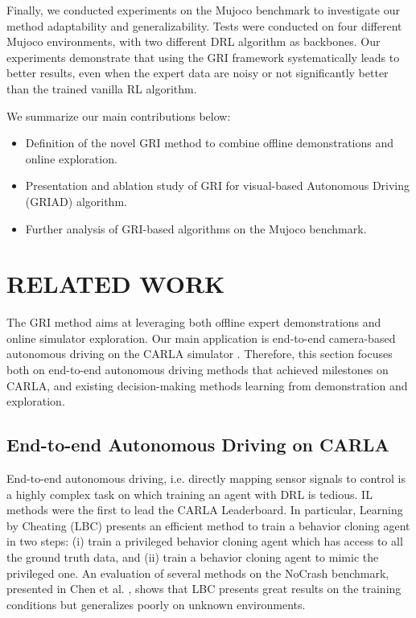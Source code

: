 \documentclass[letterpaper, 10 pt, conference]{ieeeconf}
\begin{document}
Finally, we conducted experiments on the Mujoco \cite{mujoco} benchmark to investigate our method adaptability and generalizability. Tests were conducted on four different Mujoco environments, with two different DRL algorithm as backbones. Our experiments demonstrate that using the GRI framework systematically leads to better results, even when the expert data are noisy or not significantly better than the trained vanilla RL algorithm.

We summarize our main contributions below:
\begin{itemize}
\itemsep0em 

    \item Definition of the novel GRI method to combine offline demonstrations and online exploration.
    \item Presentation and ablation study of GRI for visual-based Autonomous Driving (GRIAD) algorithm.
    \item Further analysis of GRI-based algorithms on the Mujoco benchmark. 
\end{itemize}


\section{RELATED WORK}
The GRI method aims at leveraging both offline expert demonstrations and online simulator exploration. Our main application is end-to-end camera-based autonomous driving on the CARLA simulator \cite{carla}. Therefore, this section focuses both on end-to-end autonomous driving methods that achieved milestones on CARLA, and existing decision-making methods learning from demonstration and exploration.
\label{sec:bib}
\subsection{End-to-end Autonomous Driving on CARLA}
End-to-end autonomous driving, i.e. directly mapping sensor signals to control is a highly complex task on which training an agent with DRL is tedious. 
IL methods were the first to lead the CARLA Leaderboard. In particular, Learning by Cheating (LBC) \cite{lbc} presents an efficient method to train a behavior cloning agent in two steps: (i) train a privileged  behavior cloning agent which has access to all the ground truth data, and (ii) train a behavior cloning agent to mimic the privileged one. An evaluation of several methods on the NoCrash benchmark, presented in Chen et al. \cite{wor}, shows that LBC presents great results on the training conditions but generalizes poorly on unknown environments.
\end{document}
